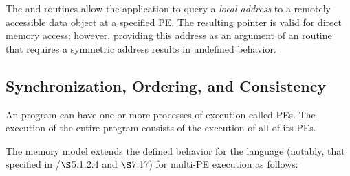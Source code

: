 The  and  routines allow the application to query a {\em local
address} to a remotely accessible data object at a specified \ac{PE}.  The
resulting pointer is valid for direct memory access; however, providing this
address as an argument of an \openshmem routine that requires a symmetric
address results in undefined behavior.

\subsection{Synchronization, Ordering, and Consistency}

An \openshmem program can have one or more processes of execution
called \acp{PE}.  The execution of the entire \openshmem program
consists of the execution of all of its \acp{PE}.

The \openshmem memory model extends the defined behavior for the \Cstd
language (notably, that specified in \Cstd[11]/\Cstd[17] $\S$5.1.2.4
and $\S$7.17) for multi-\ac{PE} execution as follows:

